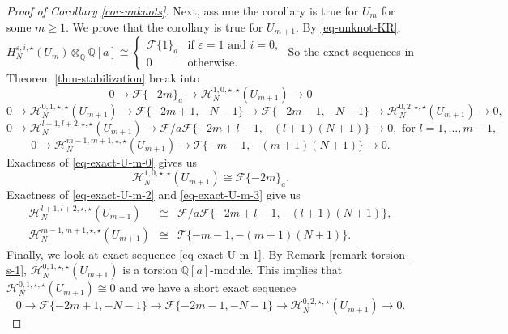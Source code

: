 \documentclass{amsart}
\theoremstyle{plain}
\theoremstyle{definition}
\theoremstyle{remark}
\numberwithin{equation}{section}
\begin{document}
\begin{proof}[Proof of Corollary \ref{cor-unknots}]
Next, assume the corollary is true for $U_m$ for some $m\geq 1$. We prove that the corollary is true for $U_{m+1}$. By \eqref{eq-unknot-KR}, $H_N^{{\varepsilon},i,\star}(U_m)\otimes_{\mathbb{Q}} {\mathbb{Q}}[a] \cong \begin{cases}
\mathcal{F} \{1\}_a & \text{if } {\varepsilon}=1 \text{ and } i=0, \\
0 & \text{otherwise.} 
\end{cases}$ 
So the exact sequences in Theorem \ref{thm-stabilization} break into 
\begin{equation}\label{eq-exact-U-m-0}
0 \rightarrow \mathcal{F} \{-2m\}_a \rightarrow {\mathcal{H}}_N^{1,0,\star,\star}(U_{m+1}) \rightarrow 0
\end{equation}
\begin{equation}\label{eq-exact-U-m-1}
0 \rightarrow {\mathcal{H}}_N^{0,1,\star,\star}(U_{m+1}) \rightarrow \mathcal{F}\{-2m+1, -N-1\} \rightarrow \mathcal{F}\{-2m-1,-N-1\} \rightarrow {\mathcal{H}}_N^{0,2,\star,\star}(U_{m+1}) \rightarrow 0,
\end{equation}
\begin{equation}\label{eq-exact-U-m-2}
0 \rightarrow {\mathcal{H}}_N^{l+1,l+2,\star,\star}(U_{m+1}) \rightarrow \mathcal{F}/a\mathcal{F}  \{-2m+l-1, -(l+1)(N+1)\} \rightarrow 0, \text{ for } l=1,\dots,m-1,
\end{equation}
\begin{equation}\label{eq-exact-U-m-3}
 0 \rightarrow  {\mathcal{H}}_N^{m-1,m+1,\star,\star}(U_{m+1})  \rightarrow \mathcal{T} \{-m-1, -(m+1)(N+1)\} \rightarrow 0.
\end{equation}
Exactness of \eqref{eq-exact-U-m-0} gives us 
\[
{\mathcal{H}}_N^{1,0,\star,\star}(U_{m+1}) \cong \mathcal{F} \{-2m\}_a. 
\]
Exactness of \eqref{eq-exact-U-m-2} and \eqref{eq-exact-U-m-3} give us 
\begin{eqnarray*}
{\mathcal{H}}_N^{l+1,l+2,\star,\star}(U_{m+1}) & \cong & \mathcal{F}/a\mathcal{F} \{-2m+l-1, -(l+1)(N+1)\}, \\
{\mathcal{H}}_N^{m-1,m+1,\star,\star}(U_{m+1}) & \cong & \mathcal{T} \{-m-1, -(m+1)(N+1)\}.
\end{eqnarray*}
Finally, we look at exact sequence \eqref{eq-exact-U-m-1}. By Remark \ref{remark-torsion-s-1}, ${\mathcal{H}}_N^{0,1,\star,\star}(U_{m+1})$ is a torsion ${\mathbb{Q}}[a]$-module. This implies that ${\mathcal{H}}_N^{0,1,\star,\star}(U_{m+1}) \cong 0$ and we have a short exact sequence
\[
0 \rightarrow \mathcal{F}\{-2m+1, -N-1\} \rightarrow \mathcal{F}\{-2m-1,-N-1\} \rightarrow {\mathcal{H}}_N^{0,2,\star,\star}(U_{m+1}) \rightarrow 0.
\]
\end{proof}
\end{document}
